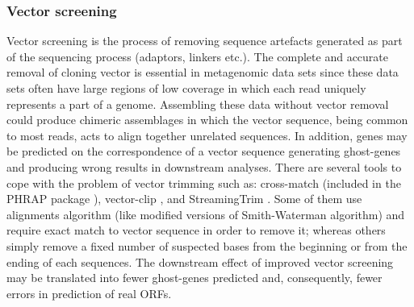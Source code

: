 \subsubsection*{Vector screening}
Vector screening is the process of removing sequence artefacts generated as part of the sequencing process (adaptors, linkers etc.). The complete and accurate removal of cloning vector is essential in metagenomic data sets since these data sets often have large regions of low coverage in which each read uniquely represents a part of a genome. Assembling these data without vector removal could produce chimeric assemblages in which the vector sequence, being common to most reads, acts to align together unrelated sequences. In addition, genes may be predicted on the correspondence of a vector sequence generating ghost-genes and producing wrong results in downstream analyses. There are several tools to cope with the problem of vector trimming such as: cross-match (included in the PHRAP package \cite{bastide2007assembling}), vector-clip \cite{staden1999staden}, and StreamingTrim \cite{bacci2014streamingtrim}. Some of them use alignments algorithm (like modified versions of Smith-Waterman algorithm) and require exact match to vector sequence in order to remove it; whereas others simply remove a fixed number of suspected bases from the beginning or from the ending of each sequences. The downstream effect of improved vector screening may be translated into fewer ghost-genes predicted and, consequently, fewer errors in prediction of real ORFs.\\

